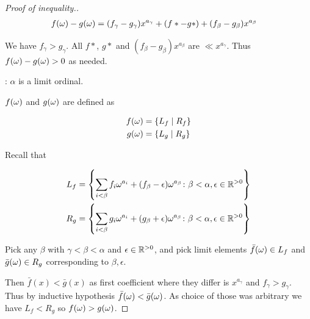\begin{proof}[Proof of inequality.]
	\begin{align*}
		f(\omega) - g(\omega) &= (f_\gamma - g_\gamma) x^{a_\gamma} + (f* - g*) + (f_\beta - g_\beta) x^{a_\beta}
	\end{align*}

	We have $f_\gamma > g_\gamma$.
	All $f*$, $g*$ and $(f_\beta - g_\beta) x^{a_\beta}$ are  $\ll x^{a_\gamma}$.
	Thus $f(\omega) - g(\omega) > 0$ as needed.

	: $\alpha$ is a limit ordinal.

	$f(\omega)$ and $g(\omega)$ are defined as 

	\begin{align*}
		f(\omega) &= \left\{ L_f \mid R_f \right\} \\
		g(\omega) &= \left\{ L_g \mid R_g \right\}
	\end{align*}

	Recall that

	\begin{align*}
		L_f &= \left\{ \sum_{i < \beta} f_i \omega^{a_i} + (f_\beta - \epsilon) \omega^{a_\beta}
		\colon \beta < \alpha, \epsilon \in \mathbb{R}^{>0} \right\} \\
		R_g &= \left\{ \sum_{i < \beta} g_i \omega^{a_i} + (g_\beta + \epsilon) \omega^{a_\beta}
		\colon \beta < \alpha, \epsilon \in \mathbb{R}^{>0} \right\}
	\end{align*}

	Pick any $\beta$ with $\gamma < \beta < \alpha$ and $\epsilon \in \mathbb{R}^{>0}$,
	and pick limit elements $\bar f(\omega) \in L_f$ and $\bar g(\omega) \in R_g$ corresponding to $\beta, \epsilon$.

	Then $\bar f(x) < \bar g(x)$ as first coefficient where they differ is $x^{a_\gamma}$ and $f_\gamma > g_\gamma$.
	Thus by inductive hypothesis $\bar f(\omega) < \bar g(\omega)$.
	As choice of those was arbitrary we have $L_f < R_g$ so $f(\omega) > g(\omega)$.
\end{proof}

